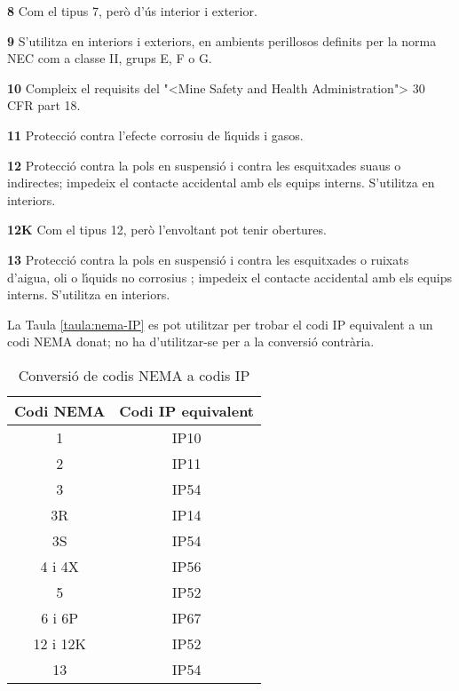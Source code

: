 \begin{list}{}
   \item[\textbf{8}] Com el tipus 7, per\`{o} d'\'{u}s interior i exterior.
   \item[\textbf{9}] S'utilitza en interiors i exteriors, en ambients perillosos definits per la norma \textsf{NEC} com a classe II, grups E, F o G.
   \item[\textbf{10}] Compleix el requisits del {"<}Mine Safety and Health Administration{">} 30 CFR part 18.
   \item[\textbf{11}] Protecci\'{o} contra l'efecte corrosiu de l\'{\i}quids i gasos.
   \item[\textbf{12}] Protecci\'{o} contra la pols en suspensi\'{o} i contra les esquitxades suaus o indirectes; impedeix el contacte accidental amb els equips interns. S'utilitza en interiors.
   \item[\textbf{12K}] Com el tipus 12, per\`{o} l'envoltant pot tenir obertures.
   \item[\textbf{13}] Protecci\'{o} contra la pols en suspensi\'{o} i contra les esquitxades o ruixats d'aigua, oli o l\'{\i}quids no corrosius ; impedeix el contacte accidental amb els equips interns. S'utilitza en interiors.
\end{list}

\pagebreak La Taula \vref{taula:nema-IP} es pot utilitzar per trobar el codi \textsf{IP} equivalent a un codi \textsf{NEMA} donat; no ha d'utilitzar-se per a la conversi\'{o} contr\`{a}ria.
\begin{table}[htb]
   \caption{\label{taula:nema-IP} Conversi\'{o} de codis \textsf{NEMA} a codis \textsf{IP}}
   \begin{center}\begin{tabular}{cc}
   \toprule[1pt]
   Codi \textsf{NEMA} & Codi \textsf{IP} equivalent \\
   \midrule
   1 & IP10 \\
   2 & IP11 \\
   3 & IP54 \\
   3R & IP14 \\
   3S & IP54 \\
   4 i 4X & IP56 \\
   5 & IP52 \\
   6 i 6P & IP67\\
   12 i 12K & IP52 \\
   13 & IP54 \\
   \bottomrule[1pt]
   \end{tabular} \end{center}
\end{table}



